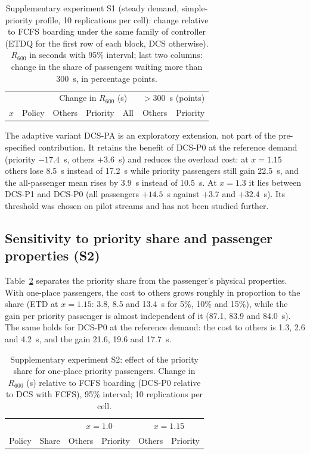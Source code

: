 \documentclass[12pt,a4paper]{article}
\begin{document}
\begin{table}[htbp]\centering
\caption{Supplementary experiment S1 (steady demand, simple-priority profile, 10 replications per cell): change relative to FCFS boarding under the same family of controller (ETDQ for the first row of each block, DCS otherwise). $R_{600}$ in seconds with 95\% interval; last two columns: change in the share of passengers waiting more than 300~s, in percentage points.}\label{tab:s1}
\footnotesize\setlength{\tabcolsep}{3.5pt}
\begin{tabular}{@{}llrrrrr@{}}
\toprule & & \multicolumn{3}{c}{Change in $R_{600}$ (s)} & \multicolumn{2}{c}{$>300$~s (points)}\\
$x$ & Policy & Others & Priority & All & Others & Priority\\\midrule

\end{tabular}
\end{table}

The adaptive variant DCS-PA is an exploratory extension, not part of the pre-specified contribution. It retains the benefit of DCS-P0 at the reference demand (priority $-17.4$~s, others $+3.6$~s) and reduces the overload cost: at $x=1.15$ others lose 8.5~s instead of 17.2~s while priority passengers still gain 22.5~s, and the all-passenger mean rises by 3.9~s instead of 10.5~s. At $x=1.3$ it lies between DCS-P1 and DCS-P0 (all passengers $+14.5$~s against $+3.7$ and $+32.4$~s). Its threshold was chosen on pilot streams and has not been studied further.

\subsection{Sensitivity to priority share and passenger properties (S2)}\label{sec:res-sens}
Table~\ref{tab:s2a} separates the priority share from the passenger's physical properties. With one-place passengers, the cost to others grows roughly in proportion to the share (ETD at $x=1.15$: 3.8, 8.5 and 13.4~s for 5\%, 10\% and 15\%), while the gain per priority passenger is almost independent of it (87.1, 83.9 and 84.0~s). The same holds for DCS-P0 at the reference demand: the cost to others is 1.3, 2.6 and 4.2~s, and the gain 21.6, 19.6 and 17.7~s.

\begin{table}[htbp]\centering
\caption{Supplementary experiment S2: effect of the priority share for one-place priority passengers. Change in $R_{600}$ (s) relative to FCFS boarding (DCS-P0 relative to DCS with FCFS), 95\% interval; 10 replications per cell.}\label{tab:s2a}
\footnotesize\setlength{\tabcolsep}{4pt}
\begin{tabular}{@{}llrrrr@{}}
\toprule & & \multicolumn{2}{c}{$x=1.0$} & \multicolumn{2}{c}{$x=1.15$}\\
Policy & Share & Others & Priority & Others & Priority\\\midrule

\end{tabular}
\end{table}
\end{document}

